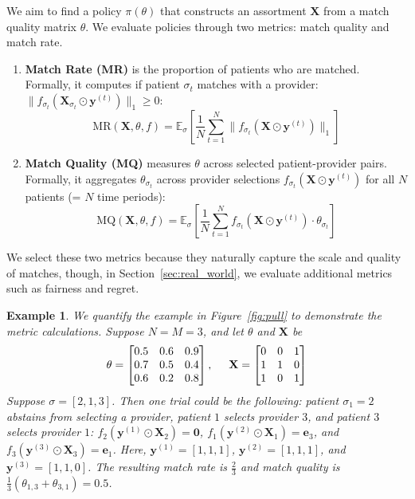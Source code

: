 \documentclass[11pt]{article}
\newtheorem{example}{Example}[section]
\begin{document}
We aim to find a policy $\pi(\theta)$ that constructs an assortment $\mathbf{X}$ from a match quality matrix $\theta$. 
We evaluate policies through two metrics: match quality and match rate. 
\begin{enumerate}  
    \item \textbf{Match Rate (MR)} is the proportion of patients who are matched. Formally, it computes if patient $\sigma_{t}$ matches with a provider: $\lVert f_{\sigma_{t}}(\mathbf{X}_{\sigma_{t}} \odot \mathbf{y}^{(t)}) \rVert_{1} \geq 0$: 
    \begin{equation}
        \mathrm{MR}(\mathbf{X},\theta,f) = \mathbb{E}_{\sigma}[\frac{1}{N} \sum_{t=1}^{N} \lVert f_{\sigma_{t}}(\mathbf{X} \odot \mathbf{y}^{(t)}) \rVert_{1}]
    \end{equation}
    \item \textbf{Match Quality (MQ)} measures $\theta$ across selected patient-provider pairs. Formally, it aggregates $\theta_{\sigma_{t}}$ across provider selections $f_{\sigma_{t}}(\mathbf{X} \odot \mathbf{y}^{(t)})$ for all $N$ patients (= $N$ time periods):
    \begin{equation}
       \mathrm{MQ}(\mathbf{X},\theta,f) = \mathbb{E}_{\sigma}[\frac{1}{N} \sum_{t=1}^{N} f_{\sigma_{t}}(\mathbf{X} \odot \mathbf{y}^{(t)}) \cdot \theta_{\sigma_{t}}]
    \end{equation} 
\end{enumerate}
We select these two metrics because they naturally capture the scale and quality of matches, though, in Section~\ref{sec:real_world}, we evaluate additional metrics such as fairness and regret. 

\begin{example}
    We quantify the example in Figure~\ref{fig:pull} to demonstrate the metric calculations. 
    Suppose $N=M=3$, and let $\theta$ and $\mathbf{X}$ be 
    \begin{equation} 
        \theta =
        \begin{bmatrix}
        0.5 & 0.6 & 0.9 \\
        0.7 & 0.5 & 0.4 \\
        0.6 & 0.2 & 0.8
        \end{bmatrix}, \hspace{0.5cm}
        \mathbf{X} =
        \begin{bmatrix}
        0 & 0 & 1 \\
        1 & 1 & 0 \\
        1 & 0 & 1
        \end{bmatrix}
    \end{equation}
    Suppose $\sigma = [2,1,3]$. 
    Then one trial could be the following: patient $\sigma_{1}=2$ abstains from selecting a provider, patient $1$ selects provider $3$, and patient $3$ selects provider $1$: $f_{2}(\mathbf{y}^{(1)} \odot \mathbf{X}_{2}) = \mathbf{0}$, $f_{1}(\mathbf{y}^{(2)} \odot \mathbf{X}_{1}) = \mathbf{e}_{3}$, and $f_{3}(\mathbf{y}^{(3)} \odot \mathbf{X}_{3}) = \mathbf{e}_{1}$. 
    Here, $\mathbf{y}^{(1)} = [1,1,1]$, $\mathbf{y}^{(2)} = [1,1,1]$, and $\mathbf{y}^{(3)} = [1,1,0]$. The resulting match rate is $\frac{2}{3}$ and match quality is $\frac{1}{3}(\theta_{1,3} + \theta_{3,1}) = 0.5$.
\end{example}
\end{document}
